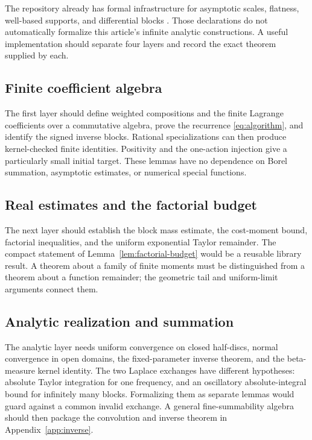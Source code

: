 \documentclass[11pt,a4paper]{article}
\numberwithin{equation}{section}
\theoremstyle{definition}
\theoremstyle{remark}
\theoremstyle{definition}
\begin{document}
The repository already has formal infrastructure for asymptotic scales,
flatness, well-based supports, and differential blocks \cite{project}.
Those declarations do not automatically formalize this article's
infinite analytic constructions. A useful implementation should separate
four layers and record the exact theorem supplied by each.

\subsection{Finite coefficient algebra}
The first layer should define weighted compositions and the finite
Lagrange coefficients over a commutative algebra, prove the recurrence
\eqref{eq:algorithm}, and identify the signed inverse blocks. Rational
specializations can then produce kernel-checked finite identities.
Positivity and the one-action injection give a particularly small
initial target. These lemmas have no dependence on Borel summation,
asymptotic estimates, or numerical special functions.

\subsection{Real estimates and the factorial budget}
The next layer should establish the block mass estimate, the cost-moment
bound, factorial inequalities, and the uniform exponential Taylor
remainder. The compact statement of Lemma~\ref{lem:factorial-budget}
would be a reusable library result. A theorem about a family of finite
moments must be distinguished from a theorem about a function remainder;
the geometric tail and uniform-limit arguments connect them.

\subsection{Analytic realization and summation}
The analytic layer needs uniform convergence on closed half-discs,
normal convergence in open domains, the fixed-parameter inverse theorem,
and the beta-measure kernel identity. The two Laplace exchanges have
different hypotheses: absolute Taylor integration for one frequency,
and an oscillatory absolute-integral bound for infinitely many blocks.
Formalizing them as separate lemmas would guard against a common invalid
exchange. A general fine-summability algebra should then package the
convolution and inverse theorem in Appendix~\ref{app:inverse}.
\end{document}
